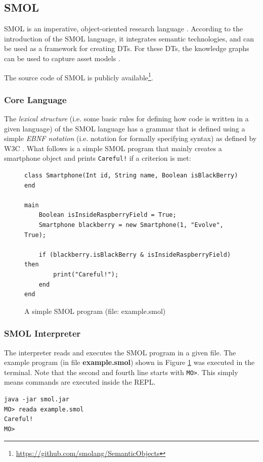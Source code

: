 \documentclass{article}
\begin{document}
\subsection{SMOL}\label{subsec:SMOL}
SMOL is an imperative, object-oriented research language \cite{noauthor_smol_nodate-1}. According to the introduction of the SMOL language, it integrates semantic technologies, and can be used as a framework for creating DTs. For these DTs, the knowledge graphs can be used to capture asset models \cite{noauthor_introduction_nodate}.

The source code of SMOL is publicly available\footnote{\url{https://github.com/smolang/SemanticObjects}}.

\subsubsection{Core Language} 
The \emph{lexical structure} (i.e. some basic rules for defining how code is written in a given language) of the SMOL language has a grammar that is defined using a simple \emph{EBNF notation} (i.e. notation for formally specifying syntax) as defined by W3C \cite{noauthor_lexical_nodate, noauthor_ebnf_nodate}. What follows is a simple SMOL program that mainly creates a smartphone object and prints \verb|Careful!| if a criterion is met:

\begin{figure}[H]
    \centering
    \caption{A simple SMOL program (file: example.smol)}
    \label{fig:smol_program}
    \begin{Verbatim}[frame=single]
class Smartphone(Int id, String name, Boolean isBlackBerry) end

main
    Boolean isInsideRaspberryField = True;
    Smartphone blackberry = new Smartphone(1, "Evolve", True);

    if (blackberry.isBlackBerry & isInsideRaspberryField) then
        print("Careful!");
    end
end

    \end{Verbatim}
\end{figure}

\subsubsection{SMOL Interpreter}

The interpreter reads and executes the SMOL program in a given file. The example program (in file \textbf{example.smol}) shown in Figure \ref{fig:smol_program} was executed in the terminal. Note that the second and fourth line starts with \verb|MO>|. This simply means commands are executed inside the REPL.
\begin{Verbatim}[frame=single]
java -jar smol.jar
MO> reada example.smol
Careful!
MO>
\end{Verbatim}
\end{document}
